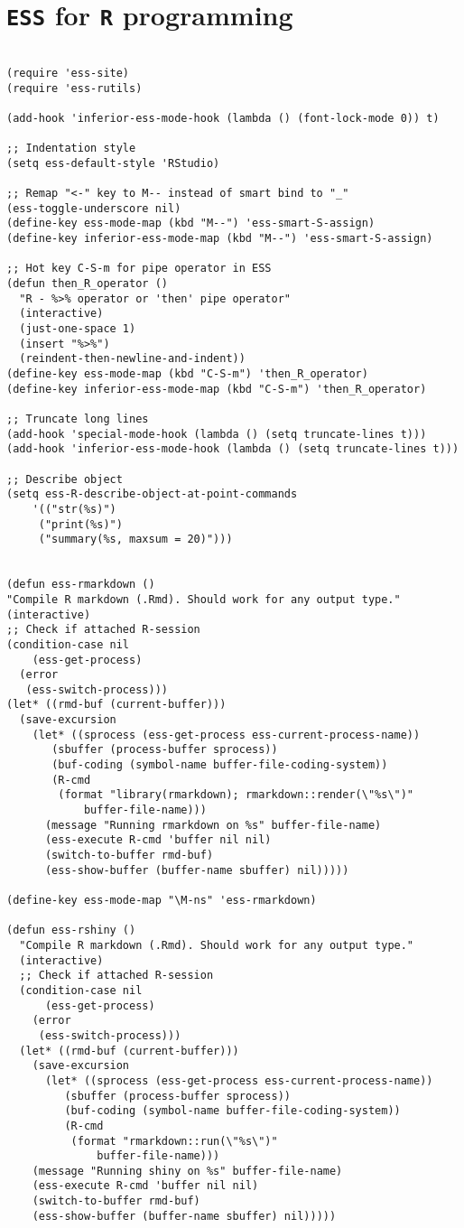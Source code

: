 \documentclass[11pt]{article}
\begin{document}
\section{\texttt{ESS} for \texttt{R} programming}
\label{sec:org8ab440a}

\begin{verbatim}

(require 'ess-site)
(require 'ess-rutils)

(add-hook 'inferior-ess-mode-hook (lambda () (font-lock-mode 0)) t)

;; Indentation style
(setq ess-default-style 'RStudio)

;; Remap "<-" key to M-- instead of smart bind to "_"
(ess-toggle-underscore nil)
(define-key ess-mode-map (kbd "M--") 'ess-smart-S-assign)
(define-key inferior-ess-mode-map (kbd "M--") 'ess-smart-S-assign)

;; Hot key C-S-m for pipe operator in ESS
(defun then_R_operator ()
  "R - %>% operator or 'then' pipe operator"
  (interactive)
  (just-one-space 1)
  (insert "%>%")
  (reindent-then-newline-and-indent))
(define-key ess-mode-map (kbd "C-S-m") 'then_R_operator)
(define-key inferior-ess-mode-map (kbd "C-S-m") 'then_R_operator)

;; Truncate long lines
(add-hook 'special-mode-hook (lambda () (setq truncate-lines t)))
(add-hook 'inferior-ess-mode-hook (lambda () (setq truncate-lines t)))

;; Describe object
(setq ess-R-describe-object-at-point-commands
    '(("str(%s)")
     ("print(%s)")
     ("summary(%s, maxsum = 20)")))


(defun ess-rmarkdown ()
"Compile R markdown (.Rmd). Should work for any output type."
(interactive)
;; Check if attached R-session
(condition-case nil
    (ess-get-process)
  (error
   (ess-switch-process)))
(let* ((rmd-buf (current-buffer)))
  (save-excursion
    (let* ((sprocess (ess-get-process ess-current-process-name))
	   (sbuffer (process-buffer sprocess))
	   (buf-coding (symbol-name buffer-file-coding-system))
	   (R-cmd
	    (format "library(rmarkdown); rmarkdown::render(\"%s\")"
		    buffer-file-name)))
      (message "Running rmarkdown on %s" buffer-file-name)
      (ess-execute R-cmd 'buffer nil nil)
      (switch-to-buffer rmd-buf)
      (ess-show-buffer (buffer-name sbuffer) nil)))))

(define-key ess-mode-map "\M-ns" 'ess-rmarkdown)

(defun ess-rshiny ()
  "Compile R markdown (.Rmd). Should work for any output type."
  (interactive)
  ;; Check if attached R-session
  (condition-case nil
      (ess-get-process)
    (error
     (ess-switch-process)))
  (let* ((rmd-buf (current-buffer)))
    (save-excursion
      (let* ((sprocess (ess-get-process ess-current-process-name))
	     (sbuffer (process-buffer sprocess))
	     (buf-coding (symbol-name buffer-file-coding-system))
	     (R-cmd
	      (format "rmarkdown::run(\"%s\")"
		      buffer-file-name)))
	(message "Running shiny on %s" buffer-file-name)
	(ess-execute R-cmd 'buffer nil nil)
	(switch-to-buffer rmd-buf)
	(ess-show-buffer (buffer-name sbuffer) nil)))))


\end{verbatim}
\end{document}
